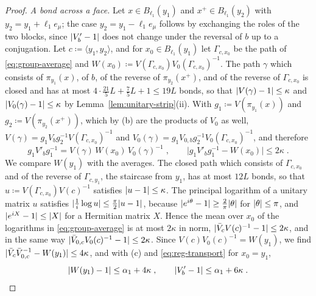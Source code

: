 \documentclass[11pt]{preprint}
\DeclarePairedDelimiter{\abs}{\lvert}{\rvert}
\numberwithin{equation}{section}
\theoremstyle{definition}
\theoremstyle{remark}
\theoremstyle{plain}
\begin{document}
\begin{proof}
\emph{A bond across a face.} Let $x \in B_{\ell_1}(y_1)$ and $x^+ \in B_{\ell_1}(y_2)$ with $y_2 = y_1 + \ell_1e_\mu$; the case $y_2 = y_1 - \ell_1e_\mu$ follows by exchanging the roles of the two blocks, since $\abs{V'_b - 1}$ does not change under the reversal of $b$ up to a conjugation. Let $c \coloneqq \langle y_1, y_2\rangle$, and for $x_0 \in B_{\ell_1}(y_1)$ let $\Gamma_{c,x_0}$ be the path of \eqref{eq:group-average} and $W(x_0) \coloneqq V(\Gamma_{c,x_0})V_0(\Gamma_{c,x_0})^{-1}$. The path $\gamma$ which consists of $\pi_{y_1}(x)$, of $b$, of the reverse of $\pi_{y_2}(x^+)$, and of the reverse of $\Gamma_{c,x_0}$ is closed and has at most $4 \cdot \frac{21}{5}L + \frac75L + 1 \leq 19L$ bonds, so that $\abs{V(\gamma) - 1} \leq \kappa$ and $\abs{V_0(\gamma) - 1} \leq \kappa$ by Lemma~\ref{lem:unitary-strip}(ii). With $g_1 \coloneqq V(\pi_{y_1}(x))$ and $g_2 \coloneqq V(\pi_{y_2}(x^+))$, which by (b) are the products of $V_0$ as well, $V(\gamma) = g_1V_bg_2^{-1}V(\Gamma_{c,x_0})^{-1}$ and $V_0(\gamma) = g_1V_{0,b}g_2^{-1}V_0(\Gamma_{c,x_0})^{-1}$, and therefore
\begin{equation}\label{eq:reg-transport}
    g_1V'_bg_1^{-1} = V(\gamma)\,W(x_0)\,V_0(\gamma)^{-1}\;,
    \qquad
    \bigl\lvert g_1V'_bg_1^{-1} - W(x_0)\bigr\rvert \leq 2\kappa\;.
\end{equation}
We compare $W(y_1)$ with the averages. The closed path which consists of $\Gamma_{c,x_0}$ and of the reverse of $\Gamma_{c,y_1}$, the staircase from $y_1$, has at most $12L$ bonds, so that $u \coloneqq V(\Gamma_{c,x_0})V(c)^{-1}$ satisfies $\abs{u - 1} \leq \kappa$. The principal logarithm of a unitary matrix $u$ satisfies $\abs{\frac1i\log u} \leq \frac\pi2\abs{u - 1}$, because $\abs{e^{i\theta} - 1} \geq \frac2\pi\abs\theta$ for $\abs\theta \leq \pi$, and $\abs{e^{iX} - 1} \leq \abs X$ for a Hermitian matrix $X$. Hence the mean over $x_0$ of the logarithms in \eqref{eq:group-average} is at most $2\kappa$ in norm, $\abs{\bar V_cV(c)^{-1} - 1} \leq 2\kappa$, and in the same way $\abs{\bar V_{0,c}V_0(c)^{-1} - 1} \leq 2\kappa$. Since $V(c)V_0(c)^{-1} = W(y_1)$, we find $\abs{\bar V_c\bar V_{0,c}^{-1} - W(y_1)} \leq 4\kappa$, and with (c) and \eqref{eq:reg-transport} for $x_0 = y_1$,
\begin{equation}\label{eq:reg-face}
    \abs{W(y_1) - 1} \leq \alpha_1 + 4\kappa\;,
    \qquad
    \abs{V'_b - 1} \leq \alpha_1 + 6\kappa\;.
\end{equation}


\end{proof}
\end{document}
